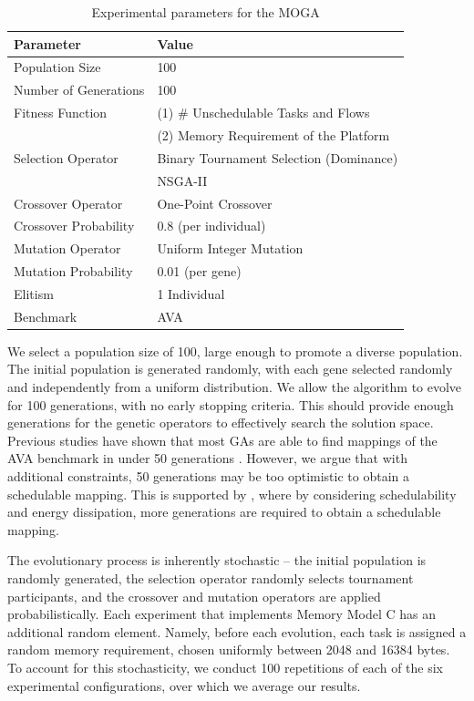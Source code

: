 \documentclass[conference]{IEEEtran}
\begin{document}
	\begin{table}[!h] \centering
		\caption{Experimental parameters for the MOGA}
		\footnotesize\begin{tabularx}{0.48\textwidth}{ll}
			\toprule
			Parameter & Value \\
			\midrule
			Population Size & 100 \\
			Number of Generations & 100 \\
			Fitness Function & (1) \# Unschedulable Tasks and Flows \\
			& (2) Memory Requirement of the Platform \\
			Selection Operator & Binary Tournament Selection (Dominance) \\
			& NSGA-II \\
			Crossover Operator & One-Point Crossover \\
			Crossover Probability & 0.8 (per individual) \\
			Mutation Operator & Uniform Integer Mutation \\
			Mutation Probability & 0.01 (per gene) \\
			Elitism & 1 Individual \\
			Benchmark & AVA \\
			\bottomrule
		\end{tabularx}
	
		\label{table:moga_config}
	\end{table}
	
We select a population size of 100, large enough to promote a diverse population. The initial population is generated randomly, with each gene selected randomly and independently from a uniform distribution. We allow the algorithm to evolve for 100 generations, with no early stopping criteria. This should provide enough generations for the genetic operators to effectively search the solution space. Previous studies have shown that most GAs are able to find mappings of the AVA benchmark in under 50 generations \cite{indrusiak2014end}. However, we argue that with additional constraints, 50 generations may be too optimistic to obtain a schedulable mapping. This is supported by \cite{Sayuti13real}, where by considering schedulability and energy dissipation, more generations are required to obtain a schedulable mapping.
	
The evolutionary process is inherently stochastic -- the initial population is randomly generated, the selection operator randomly selects tournament participants, and the crossover and mutation operators are applied probabilistically. Each experiment that implements Memory Model C has an additional random element. Namely, before each evolution, each task is assigned a random memory requirement, chosen uniformly between 2048 and 16384 bytes. To account for this stochasticity, we conduct 100 repetitions of each of the six experimental configurations, over which we average our results.
\end{document}
